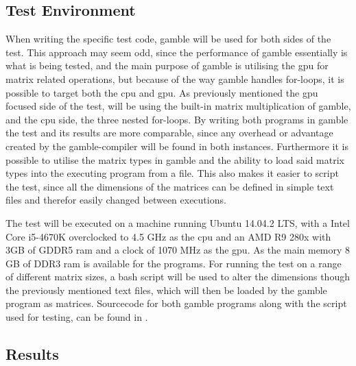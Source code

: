 \subsection{Test Environment} %
\label{sub:test_environment}
When writing the specific test code, \gls{gamble} will be used for both sides of the test.
This approach may seem odd, since the performance of \gls{gamble} essentially is what is being tested, and the main purpose of \gls{gamble} is utilising the \gls{gpu} for matrix related operations, but because of the way \gls{gamble} handles for-loops, it is possible to target both the \gls{cpu} and \gls{gpu}.
As previously mentioned the \gls{gpu} focused side of the test, will be using the built-in matrix multiplication of \gls{gamble}, and the \gls{cpu} side, the three nested for-loops.
By writing both programs in \gls{gamble} the test and its results are more comparable, since any overhead or advantage created by the \gls{gamble}-compiler will be found in both instances.
Furthermore it is possible to utilise the matrix types in \gls{gamble} and the ability to load said matrix types into the executing program from a file.
This also makes it easier to script the test, since all the dimensions of the matrices can be defined in simple text files and therefor easily changed between executions.

The test will be executed on a machine running Ubuntu 14.04.2 LTS, with a Intel Core i5-4670K overclocked to 4.5 GHz as the \gls{cpu} and an AMD R9 280x with 3GB of GDDR5 ram and a clock of 1070 MHz as the \gls{gpu}.
As the main memory 8 GB of DDR3 ram is available for the programs.
For running the test on a range of different matrix sizes, a bash script will be used to alter the dimensions though the previously mentioned text files, which will then be loaded by the \gls{gamble} program as matrices.
Sourcecode for both \gls{gamble} programs along with the script used for testing, can be found in .

\subsection{Results} %
\label{sub:results}


